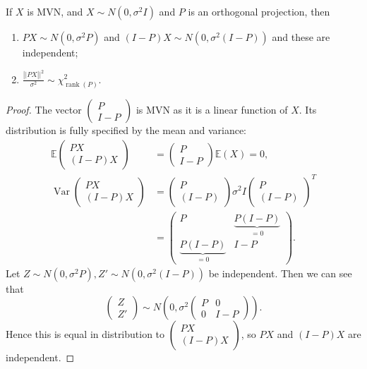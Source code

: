 \documentclass[egregdoesnotlikesansseriftitles,a4paper]{scrartcl}
\begin{document}
\begin{theorem}
      If $X$ is MVN, and $X \sim N (0, \sigma^2I)$ and $P$ is an orthogonal projection, then 
      \begin{enumerate}
           \item $PX\sim N (0, \sigma^2P)$ and $(I-P)X \sim N (0, \sigma^2 (I-P))$ and these are independent;
           \item $ \frac{\left||PX\right||^2}{\sigma^2}\sim \chi^2_{\operatorname{rank}(P)}$.
      \end{enumerate}
      \begin{proof}
            The vector $\begin{pmatrix} P\\I-P \end{pmatrix}$ is MVN as it is a linear function of $X$. Its distribution is fully specified by the mean and variance: 
            \begin{align*}
               \mathbb{E} \begin{pmatrix} PX\\(I-P)X \end{pmatrix}&= \begin{pmatrix} P\\I-P \end{pmatrix}\mathbb{E}(X)=0,\\
               \operatorname{Var}\begin{pmatrix} PX\\(I-P)X \end{pmatrix}&=\begin{pmatrix} P\\(I-P) \end{pmatrix}\sigma^2 I \begin{pmatrix} P\\(I-P) \end{pmatrix}^T\\
               &=\begin{pmatrix} P& \underbrace{P (I-P)}_{=0} \\ \underbrace{P (I-P)}_{=0}& I-P \end{pmatrix}.
            \end{align*}
            Let $Z \sim N (0, \sigma^2P), Z' \sim N (0, \sigma^2 (I-P))$ be independent. Then we can see that \[
            \begin{pmatrix} Z\\Z'\end{pmatrix} \sim N \left(0, \sigma^2 \begin{pmatrix} P&0\\0&I-P \end{pmatrix}\right) 
            .\] Hence this is equal in distribution to $\begin{pmatrix} PX\\(I-P)X \end{pmatrix}$, so $PX$ and $(I-P)X$ are independent.


\end{proof}
\end{theorem}
\end{document}
